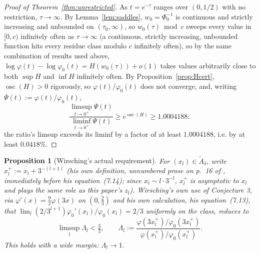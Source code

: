 \documentclass[11pt]{amsart}
\theoremstyle{plain}
\newtheorem{proposition}[theorem]{Proposition}
\theoremstyle{definition}
\theoremstyle{remark}
\begin{document}
\begin{proof}[Proof of Theorem~\ref{thm:unrestricted}]
As $t=e^{-\tau}$ ranges over $(0,1/2)$ with no restriction, $\tau\to\infty$. By
Lemma~\ref{lem:saddles}, $w_0=\Phi_0^{-1}$ is continuous and strictly increasing and unbounded on
$(\tau_0,\infty)$, so $w_0(\tau)\bmod c$ sweeps every value in $[0,c)$ infinitely often as
$\tau\to\infty$ (a continuous, strictly increasing, unbounded function hits every residue class
modulo $c$ infinitely often), so by the same combination of results used above,
$\log\varphi(t)-\log\varphi_0(t) = H(w_0(\tau))+o(1)$ takes values arbitrarily close to both $\sup H$
and $\inf H$ infinitely often. By Proposition~\ref{prop:Hcert}, $\operatorname{osc}(H) > 0$
rigorously, so $\varphi(t)/\varphi_0(t)$ does not converge, and, writing $\Psi(t) :=
\varphi(t)/\varphi_0(t)$,
\[
\frac{\limsup_{t\to0^+}\Psi(t)}{\liminf_{t\to0^+}\Psi(t)} \ge e^{\operatorname{osc}(H)} \ge 1.0004188:
\]
the ratio's limsup exceeds its liminf by a factor of at least $1.0004188$, i.e. by at least
$0.0418\%$.
\end{proof}

\begin{proposition}[Wirsching's actual requirement]
\label{prop:wirschingreq}
For $(x_l)\in\widetilde A_\delta$, write $x_l^+ := x_l + 3^{-(l+1)}$ (his own definition, unnumbered
prose on p.~16 of \cite{wirsching2003}, immediately before his equation~(7.14); since
$x_l\sim l\cdot3^{-l}$, $x_l^+$ is asymptotic to $x_l$ and plays the same role as this paper's
$z_l$). Wirsching's own use of Conjecture 3, via $\varphi'(x)=\tfrac92\varphi(3x)$ on $(0,\tfrac23)$
and his own calculation, his equation~(7.13), that $\lim_l (2/3^{l+1})\varphi_0'(x_l)/\varphi_0(x_l)
= 2/3$ uniformly on the class, reduces to
\[
\limsup_l \Lambda_l < \tfrac32, \qquad
\Lambda_l := \frac{\varphi(3x_l^+)/\varphi_0(3x_l^+)}{\varphi(x_l^+)/\varphi_0(x_l^+)}.
\]
This holds with a wide margin: $\Lambda_l \to 1$.
\end{proposition}
\end{document}
